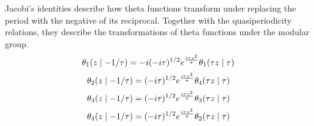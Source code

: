 \documentclass[12pt]{article}
\begin{document}
Jacobi's identities describe how theta functions transform under replacing the period with the negative of its reciprocal.  Together with the quasiperiodicity relations, they describe the transformations of theta functions under the modular group.
$$\theta_1 (z \mid -1/\tau) = -i (-i \tau)^{1/2} e^{i \tau z^2 \over \pi} \theta_1 (\tau z \mid \tau)$$
$$\theta_2 (z \mid -1/\tau) = (-i \tau)^{1/2} e^{i \tau z^2 \over \pi} \theta_4 (\tau z \mid \tau)$$
$$\theta_3 (z \mid -1/\tau) = (-i \tau)^{1/2} e^{i \tau z^2 \over \pi} \theta_3 (\tau z \mid \tau)$$
$$\theta_4 (z \mid -1/\tau) = (-i \tau)^{1/2} e^{i \tau z^2 \over \pi} \theta_2 (\tau z \mid \tau)$$
\end{document}
